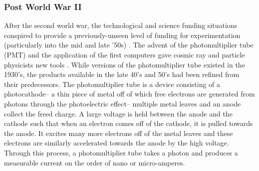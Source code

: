 \subsubsection*{Post World War II}
After the second world war, the technological and science funding situations conspired to provide a previously-unseen level of funding for experimentation (particularly into the mid and late '50s) \cite{scifund1}. The advent of the photomultiplier tube (PMT) and the application of the first computers gave cosmic ray and particle physicists new tools \cite{pmthistory}. While versions of the photomultiplier tube existed in the 1930's, the products available in the late 40's and 50's had been refined from their predecessors. The photomultiplier tube is a device consisting of a photocathode-- a thin piece of metal off of which free electrons are generated from photons through the photoelectric effect-- multiple metal leaves and an anode collect the freed charge. A large voltage is held between the anode and the cathode such that when an electron comes off of the cathode, it is pulled towards the anode. It excites many more electrons off of the metal leaves and these electrons are similarly accelerated towards the anode by the high voltage. Through this process, a photomultiplier tube takes a photon and produces a measurable current on the order of nano or micro-amperes. %


